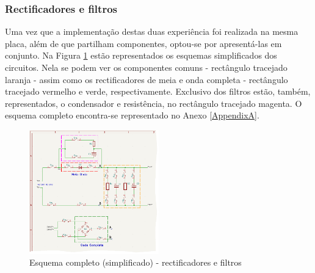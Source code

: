 \subsubsection{Rectificadores e filtros}
\label{sec:rectificadoresfiltros}
Uma vez que a implementação destas duas experiência foi realizada na mesma placa, além de que partilham componentes, optou-se por apresentá-las em conjunto. Na Figura \ref{fig:rectificacao_filtragem_full} estão representados os esquemas simplificados dos circuitos. Nela se podem ver os componentes comuns - rectângulo tracejado laranja - assim como os rectificadores de meia e onda completa - rectângulo tracejado vermelho e verde, respectivamente. Exclusivo dos filtros estão, também, representados, o condensador e resistência, no rectângulo tracejado magenta. O esquema completo encontra-se representado no Anexo \ref{AppendixA}.

\begin{figure}[hbtp]
	\centering
	\includegraphics[width=0.5\textwidth]{figures/rec_fil_FULL.png}
	\caption{Esquema completo (simplificado) - rectificadores e filtros}
	\label{fig:rectificacao_filtragem_full}
\end{figure}

